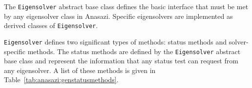 \documentclass[acmtoms]{acmtrans2m}
\newcommand{\aspace}[1]{\texttt{#1}}
\begin{document}


The \aspace{Eigensolver} abstract base class defines the basic interface that must be met
by any eigensolver class in Anasazi. Specific eigensolvers are implemented as derived
classes of \aspace{Eigensolver}.

\aspace{Eigensolver} defines two significant types of methods: status methods and
solver-specific methods. The status methods are defined by the \aspace{Eigensolver}
abstract base class and represent the information that any status test can request from
any eigensolver. A list of these methods is given in
Table~\ref{tab:anasazi:genstatusmethods}.

\end{document}
